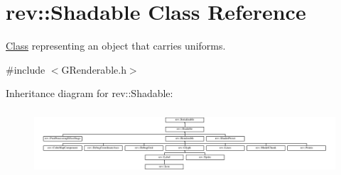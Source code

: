 \hypertarget{classrev_1_1_shadable}{}\section{rev\+::Shadable Class Reference}
\label{classrev_1_1_shadable}


\mbox{\hyperlink{struct_class}{Class}} representing an object that carries uniforms.  




{\ttfamily \#include $<$G\+Renderable.\+h$>$}

Inheritance diagram for rev\+::Shadable\+:\begin{figure}[H]
\begin{center}
\leavevmode
\includegraphics[height=2.436548cm]{classrev_1_1_shadable}
\end{center}
\end{figure}
